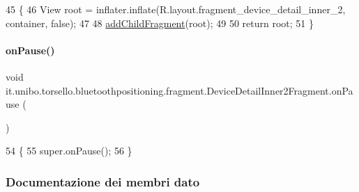 \begin{DoxyCode}
45                                                                                                       \{
46         View root = inflater.inflate(R.layout.fragment\_device\_detail\_inner\_2, container, \textcolor{keyword}{false});
47 
48         \hyperlink{classit_1_1unibo_1_1torsello_1_1bluetoothpositioning_1_1fragment_1_1DeviceDetailInner2Fragment_af61900b6821dff2086e86d646c990870_af61900b6821dff2086e86d646c990870}{addChildFragment}(root);
49 
50         \textcolor{keywordflow}{return} root;
51     \}
\end{DoxyCode}
\hypertarget{classit_1_1unibo_1_1torsello_1_1bluetoothpositioning_1_1fragment_1_1DeviceDetailInner2Fragment_ab201a51f09d4ccd17f91d5952b9ed788_ab201a51f09d4ccd17f91d5952b9ed788}{}\label{classit_1_1unibo_1_1torsello_1_1bluetoothpositioning_1_1fragment_1_1DeviceDetailInner2Fragment_ab201a51f09d4ccd17f91d5952b9ed788_ab201a51f09d4ccd17f91d5952b9ed788} 
\paragraph{\texorpdfstring{on\+Pause()}{onPause()}}
{\footnotesize\ttfamily void it.\+unibo.\+torsello.\+bluetoothpositioning.\+fragment.\+Device\+Detail\+Inner2\+Fragment.\+on\+Pause (\begin{DoxyParamCaption}{ }\end{DoxyParamCaption})}


\begin{DoxyCode}
54                           \{
55         super.onPause();
56     \}
\end{DoxyCode}


\subsubsection{Documentazione dei membri dato}
\hypertarget{classit_1_1unibo_1_1torsello_1_1bluetoothpositioning_1_1fragment_1_1DeviceDetailInner2Fragment_aa28d537983d4cf578120a9c51eb2b0bb_aa28d537983d4cf578120a9c51eb2b0bb}{}\label{classit_1_1unibo_1_1torsello_1_1bluetoothpositioning_1_1fragment_1_1DeviceDetailInner2Fragment_aa28d537983d4cf578120a9c51eb2b0bb_aa28d537983d4cf578120a9c51eb2b0bb} 
